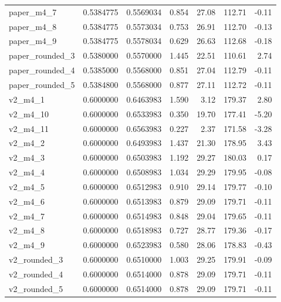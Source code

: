 \documentclass[11pt,a4paper]{article}
\begin{document}
\begin{longtable}{lrrrrrr}
paper\_m4\_7 & 0.5384775 & 0.5569034 & 0.854 & 27.08 & 112.71 & -0.11 \\
paper\_m4\_8 & 0.5384775 & 0.5573034 & 0.753 & 26.91 & 112.70 & -0.13 \\
paper\_m4\_9 & 0.5384775 & 0.5578034 & 0.629 & 26.63 & 112.68 & -0.18 \\
paper\_rounded\_3 & 0.5380000 & 0.5570000 & 1.445 & 22.51 & 110.61 & 2.74 \\
paper\_rounded\_4 & 0.5385000 & 0.5568000 & 0.851 & 27.04 & 112.79 & -0.11 \\
paper\_rounded\_5 & 0.5384800 & 0.5568000 & 0.877 & 27.11 & 112.72 & -0.11 \\
v2\_m4\_1 & 0.6000000 & 0.6463983 & 1.590 & 3.12 & 179.37 & 2.80 \\
v2\_m4\_10 & 0.6000000 & 0.6533983 & 0.350 & 19.70 & 177.41 & -5.20 \\
v2\_m4\_11 & 0.6000000 & 0.6563983 & 0.227 & 2.37 & 171.58 & -3.28 \\
v2\_m4\_2 & 0.6000000 & 0.6493983 & 1.437 & 21.30 & 178.95 & 3.43 \\
v2\_m4\_3 & 0.6000000 & 0.6503983 & 1.192 & 29.27 & 180.03 & 0.17 \\
v2\_m4\_4 & 0.6000000 & 0.6508983 & 1.034 & 29.29 & 179.95 & -0.08 \\
v2\_m4\_5 & 0.6000000 & 0.6512983 & 0.910 & 29.14 & 179.77 & -0.10 \\
v2\_m4\_6 & 0.6000000 & 0.6513983 & 0.879 & 29.09 & 179.71 & -0.11 \\
v2\_m4\_7 & 0.6000000 & 0.6514983 & 0.848 & 29.04 & 179.65 & -0.11 \\
v2\_m4\_8 & 0.6000000 & 0.6518983 & 0.727 & 28.77 & 179.36 & -0.17 \\
v2\_m4\_9 & 0.6000000 & 0.6523983 & 0.580 & 28.06 & 178.83 & -0.43 \\
v2\_rounded\_3 & 0.6000000 & 0.6510000 & 1.003 & 29.25 & 179.91 & -0.09 \\
v2\_rounded\_4 & 0.6000000 & 0.6514000 & 0.878 & 29.09 & 179.71 & -0.11 \\
v2\_rounded\_5 & 0.6000000 & 0.6514000 & 0.878 & 29.09 & 179.71 & -0.11 \\
\bottomrule\end{longtable}
\end{document}

